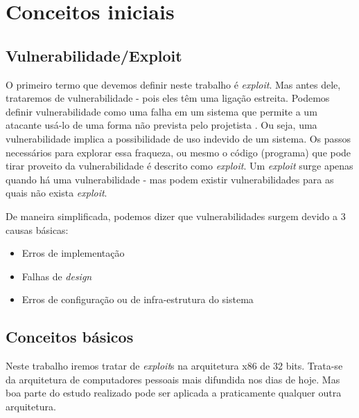 
\chapter{Conceitos iniciais}
\label{chap:conceitos_iniciais}

	\section{Vulnerabilidade/Exploit}
	\label{sec:vuln_exploit}
	O primeiro termo que devemos definir neste trabalho é \textsl{exploit}. Mas antes dele,
	trataremos de vulnerabilidade - pois eles têm uma ligação estreita.
	Podemos definir vulnerabilidade como uma falha em um sistema que permite
	a um atacante usá-lo de uma forma não prevista pelo projetista \cite{Anley2007}.
	Ou seja, uma vulnerabilidade implica a possibilidade de uso indevido de um sistema.
	Os passos necessários para explorar essa fraqueza, ou mesmo o código (programa) que pode tirar
	proveito da vulnerabilidade é descrito como \textsl{exploit}.
	Um \textsl{exploit} surge apenas quando há uma vulnerabilidade - mas podem existir
	vulnerabilidades para as quais não exista \textsl{exploit}.

	De maneira simplificada, podemos dizer que vulnerabilidades surgem devido a 3 causas básicas:
	\begin{itemize}
		\item{Erros de implementação}
		\item{Falhas de \textsl{design}}
		\item{Erros de configuração ou de infra-estrutura do sistema}
	\end{itemize}


	\section{Conceitos básicos}
		Neste trabalho iremos tratar de \textsl{exploit}s na arquitetura x86 de 32 bits. 
		Trata-se da arquitetura de computadores
		pessoais mais difundida nos dias de hoje. Mas boa parte do estudo realizado pode ser aplicada
		a praticamente qualquer outra arquitetura.

